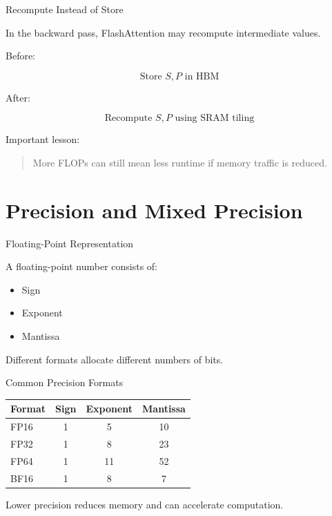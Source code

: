 \documentclass[aspectratio=169]{beamer}
\begin{document}
\begin{frame}{Recompute Instead of Store}

In the backward pass, FlashAttention may recompute intermediate values.

\vspace{0.5cm}

Before:

\[
\text{Store } S,P \text{ in HBM}
\]

After:

\[
\text{Recompute } S,P \text{ using SRAM tiling}
\]

\vspace{0.5cm}

Important lesson:

\begin{quote}
More FLOPs can still mean less runtime if memory traffic is reduced.
\end{quote}

\end{frame}

\section{Precision and Mixed Precision}

\begin{frame}{Floating-Point Representation}

A floating-point number consists of:

\begin{itemize}
    \item Sign
    \item Exponent
    \item Mantissa
\end{itemize}

\vspace{0.5cm}

Different formats allocate different numbers of bits.

\end{frame}

\begin{frame}{Common Precision Formats}

\begin{table}
\centering
\begin{tabular}{lccc}
\toprule
Format & Sign & Exponent & Mantissa \\
\midrule
FP16 & 1 & 5 & 10 \\
FP32 & 1 & 8 & 23 \\
FP64 & 1 & 11 & 52 \\
BF16 & 1 & 8 & 7 \\
\bottomrule
\end{tabular}
\end{table}

\vspace{0.5cm}

Lower precision reduces memory and can accelerate computation.

\end{frame}
\end{document}
